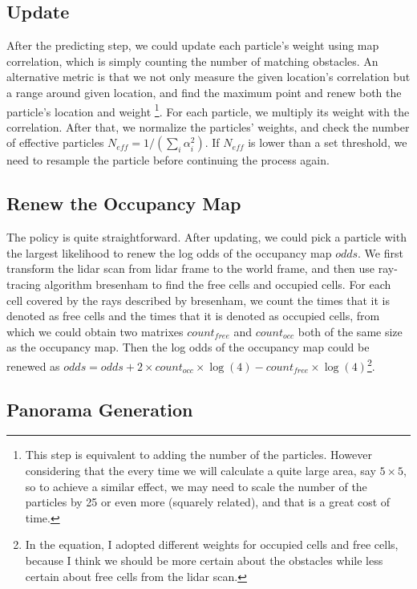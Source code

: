 \documentclass[conference]{IEEEtran}
\begin{document}
\subsection{Update}
After the predicting step, we could update each particle's weight using map correlation, which is simply counting the 
number of matching obstacles. An alternative metric is that we not only measure the given location's correlation but 
a range around given location, and find the maximum point and renew both the particle's location and weight
\footnote{This step is equivalent to adding the number of the particles. However considering that the every time we will
calculate a quite large area, say $5 \times 5$, so to achieve a similar effect, we may need to scale the number of the 
particles by 25 or even more (squarely related), and that is a great cost of time.}. For 
each particle, we multiply its weight with the correlation. After that, we normalize the particles' weights, and check the 
number of effective particles $N_{eff} = 1/(\sum_i\alpha_i^2)$. If $N_{eff}$ is lower than a set threshold, we need to resample the particle before
continuing the process again.

\subsection{Renew the Occupancy Map}
The policy is quite straightforward. After updating, we could pick a particle with the largest likelihood to renew the log
odds of the occupancy map $odds$. We first transform the lidar scan from lidar frame to the world frame, and then use ray-tracing
algorithm bresenham to find the free cells and occupied cells. For each cell covered by the rays described by bresenham, we
count the times that it is denoted as free cells and the times that it is denoted as occupied cells, from which we could 
obtain two matrixes $count_{free}$ and $count_{occ}$ both of the same size as the occupancy map. Then the log odds of the occupancy
map could be renewed as $odds = odds + 2 \times count_{occ}\times \log(4) - count_{free}\times \log(4)$\footnote{In the equation,
I adopted different weights for occupied cells and free cells, because I think we should be more certain about the obstacles
while less certain about free cells from the lidar scan.}.



\subsection{Panorama Generation}
\end{document}
